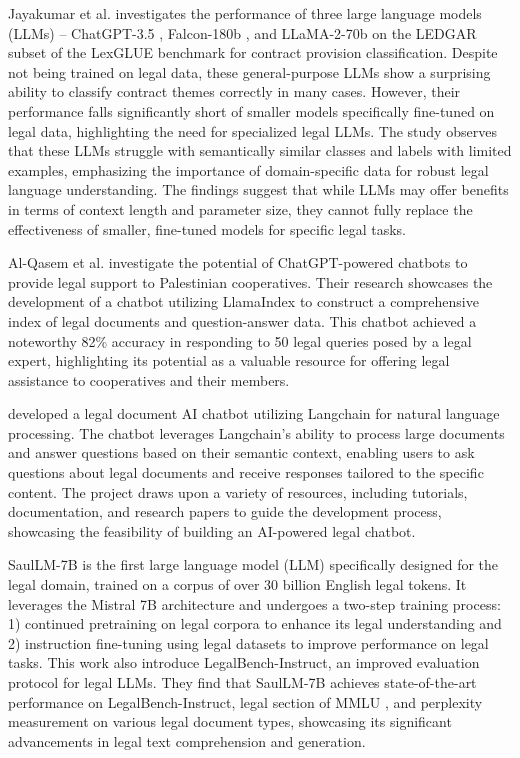 Jayakumar et al. \cite{jayakumar-etal-2023-large} investigates the performance of three large language models (LLMs) – ChatGPT-3.5 \cite{gpt3.5}, Falcon-180b \cite{falcon}, and LLaMA-2-70b \cite{llama2} on the LEDGAR subset of the LexGLUE benchmark \cite{lexglue} for contract provision classification. Despite not being trained on legal data, these general-purpose LLMs show a surprising ability to classify contract themes correctly in many cases. However, their performance falls significantly short of smaller models specifically fine-tuned on legal data, highlighting the need for specialized legal LLMs. The study observes that these LLMs struggle with semantically similar classes and labels with limited examples, emphasizing the importance of domain-specific data for robust legal language understanding. The findings suggest that while LLMs may offer benefits in terms of context length and parameter size, they cannot fully replace the effectiveness of smaller, fine-tuned models for specific legal tasks.

Al-Qasem et al. \cite{qasem2023exploitationllmbasedchatbotproviding} investigate the potential of ChatGPT-powered chatbots to provide legal support to Palestinian cooperatives. Their research showcases the development of a chatbot utilizing LlamaIndex \cite{llamaindex} to construct a comprehensive index of legal documents and question-answer data. This chatbot achieved a noteworthy 82\% accuracy in responding to 50 legal queries posed by a legal expert, highlighting its potential as a valuable resource for offering legal assistance to cooperatives and their members.

\cite{devaraj2023developmentlegaldocumentaichatbot} developed a legal document AI chatbot utilizing Langchain \cite{langchain} for natural language processing. The chatbot leverages Langchain's ability to process large documents and answer questions based on their semantic context, enabling users to ask questions about legal documents and receive responses tailored to the specific content. The project draws upon a variety of resources, including tutorials, documentation, and research papers to guide the development process, showcasing the feasibility of building an AI-powered legal chatbot.

SaulLM-7B \cite{SaulLM} is the first large language model (LLM) specifically designed for the legal domain, trained on a corpus of over 30 billion English legal tokens. It leverages the Mistral 7B \cite{mistral7b} architecture and undergoes a two-step training process: 1) continued pretraining on legal corpora to enhance its legal understanding and 2) instruction fine-tuning using legal datasets to improve performance on legal tasks. This work also introduce LegalBench-Instruct, an improved evaluation protocol for legal LLMs. They find that SaulLM-7B achieves state-of-the-art performance on LegalBench-Instruct, legal section of MMLU \cite{mmlu}, and perplexity measurement on various legal document types, showcasing its significant advancements in legal text comprehension and generation.

